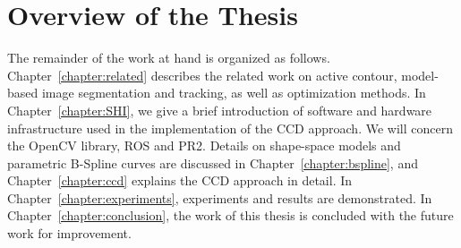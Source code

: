 

\section{Overview of the Thesis}
\label{sec:overview}
The remainder of the work at hand is organized as
follows. Chapter~\ref{chapter:related} describes the related work on
active contour, model-based image segmentation and tracking, as well
as optimization methods. In Chapter~\ref{chapter:SHI}, we give a brief introduction of software
and hardware infrastructure used in the implementation of the CCD
approach. We will concern the OpenCV library, ROS and PR2. Details on shape-space models and parametric
B-Spline curves are discussed in Chapter~\ref{chapter:bspline},  and
Chapter~\ref{chapter:ccd} explains the CCD approach in detail. 
In Chapter~\ref{chapter:experiments}, experiments and results are demonstrated.%
In Chapter~\ref{chapter:conclusion},
the work of this thesis is concluded with the future work for improvement.



